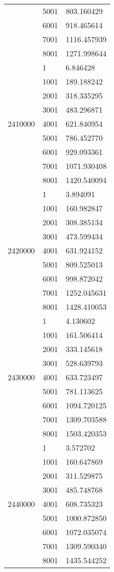 \begin{table}[htb!]
\begin{tabular}{lll}
 & 5001 & 803.160429 \\
 & 6001 & 918.465614 \\
 & 7001 & 1116.457939 \\
 & 8001 & 1271.998644 \\
\multirow[c]{9}{*}{2410000} & 1 & 6.846428 \\
 & 1001 & 189.188242 \\
 & 2001 & 318.335295 \\
 & 3001 & 483.296871 \\
 & 4001 & 621.840954 \\
 & 5001 & 786.452770 \\
 & 6001 & 929.093361 \\
 & 7001 & 1071.930408 \\
 & 8001 & 1420.540094 \\
\multirow[c]{9}{*}{2420000} & 1 & 3.894091 \\
 & 1001 & 160.982847 \\
 & 2001 & 308.385134 \\
 & 3001 & 473.599434 \\
 & 4001 & 631.924152 \\
 & 5001 & 809.525013 \\
 & 6001 & 998.872042 \\
 & 7001 & 1252.045631 \\
 & 8001 & 1428.410053 \\
\multirow[c]{9}{*}{2430000} & 1 & 4.130602 \\
 & 1001 & 161.506414 \\
 & 2001 & 333.145618 \\
 & 3001 & 528.639793 \\
 & 4001 & 633.723497 \\
 & 5001 & 781.113625 \\
 & 6001 & 1094.720125 \\
 & 7001 & 1309.703588 \\
 & 8001 & 1503.420353 \\
\multirow[c]{9}{*}{2440000} & 1 & 3.572702 \\
 & 1001 & 160.647869 \\
 & 2001 & 311.529875 \\
 & 3001 & 485.748768 \\
 & 4001 & 608.735323 \\
 & 5001 & 1000.872850 \\
 & 6001 & 1072.035074 \\
 & 7001 & 1309.590340 \\
 & 8001 & 1435.544252 \\

\end{tabular}
\end{table}
